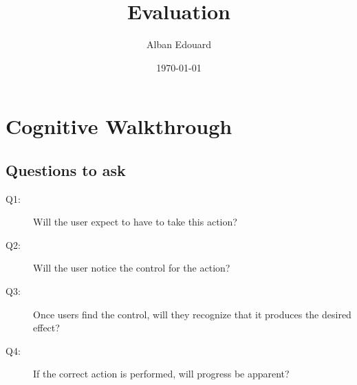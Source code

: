 \documentclass[fontsize=12pt,paper=a4]{scrartcl}
\begin{document}
\title{Evaluation}
\date{\today}
\author{Alban Edouard}
\maketitle


\section{Cognitive Walkthrough}

\subsection{Questions to ask}
\begin{description}
\item[Q1:] Will the user expect to have to take this action?
\item[Q2:] Will the user notice the control for the action?
\item[Q3:] Once users find the control, will they recognize that it produces the desired effect?
\item[Q4:] If the correct action is performed, will progress be apparent?
\end{description}
 
\end{document}

